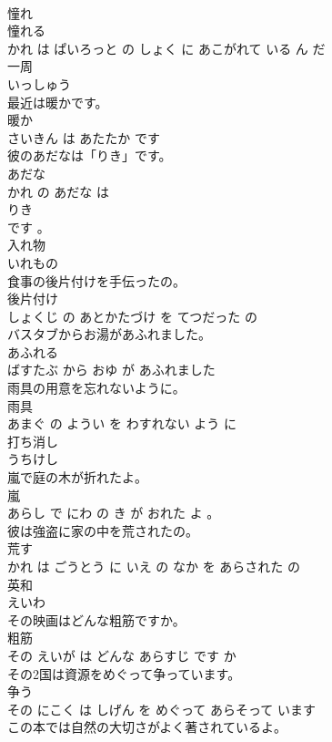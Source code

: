 \documentclass[8pt]{extreport}
\begin{document}
\begin{CJK}{UTF8}{min}
\\	憧れ 
\\	憧れる 
\\	かれ は ぱいろっと の しょく に あこがれて いる ん だ			
\\	一周	
\\	いっしゅう			
\\	最近は暖かです。	
\\	暖か 
\\	さいきん は あたたか です			
\\	彼のあだなは「りき」です。	
\\	あだな 
\\	かれ の あだな は 
\\	りき 
\\	です 。			
\\	入れ物	
\\	いれもの			
\\	食事の後片付けを手伝ったの。	
\\	後片付け 
\\	しょくじ の あとかたづけ を てつだった の			
\\	バスタブからお湯があふれました。	
\\	あふれる 
\\	ばすたぶ から おゆ が あふれました			
\\	雨具の用意を忘れないように。	
\\	雨具 
\\	あまぐ の ようい を わすれない よう に			
\\	打ち消し	
\\	うちけし			
\\	嵐で庭の木が折れたよ。	
\\	嵐 
\\	あらし で にわ の き が おれた よ 。			
\\	彼は強盗に家の中を荒されたの。	
\\	荒す 
\\	かれ は ごうとう に いえ の なか を あらされた の			
\\	英和	
\\	えいわ			
\\	その映画はどんな粗筋ですか。	
\\	粗筋 
\\	その えいが は どんな あらすじ です か			
\\	その2国は資源をめぐって争っています。	
\\	争う 
\\	その にこく は しげん を めぐって あらそって います			
\\	この本では自然の大切さがよく著されているよ。	

\end{CJK}
\end{document}
